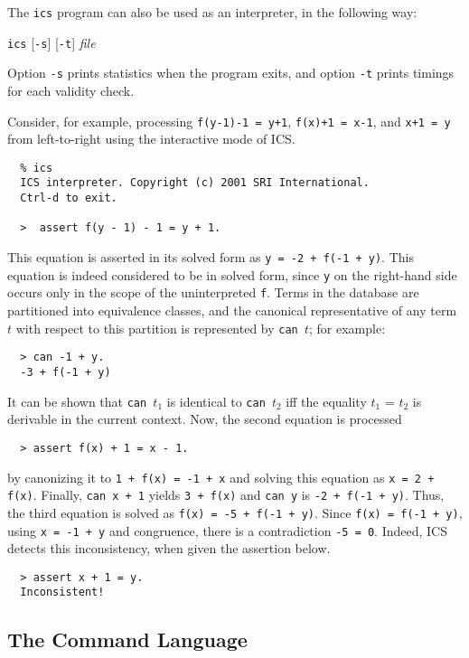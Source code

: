 \documentclass[12pt]{article}
\begin{document}
\bigskip
The \texttt{ics} program can also be used as an interpreter, in the
following way:
\begin{center}
  \texttt{ics} [\texttt{-s}] [\texttt{-t}] \textit{file}
\end{center}
Option \texttt{-s} prints statistics when the program exits, and
option \texttt{-t} prints timings for each validity check.

Consider, for example, processing
{\tt f(y-1)-1 = y+1}, {\tt f(x)+1 = x-1}, and {\tt x+1 = y}
from left-to-right using the interactive mode of ICS\@.
  \begin{verbatim}
  % ics
  ICS interpreter. Copyright (c) 2001 SRI International.
  Ctrl-d to exit.

  >  assert f(y - 1) - 1 = y + 1.
  \end{verbatim}
This equation is asserted in its solved form as
{\tt y = -2 + f(-1 + y)}\@. This equation is indeed considered
to be in solved form, since {\tt y} on the right-hand side occurs
only in the scope of the uninterpreted {\tt f}\@. Terms
in the database are partitioned
into equivalence classes, and the canonical representative of any
term $t$ with respect to this partition is represented by {\tt can $t$};
for example:
  \begin{verbatim}
  > can -1 + y.
  -3 + f(-1 + y)
  \end{verbatim}
It can be shown that {\tt can $t_1$} is identical to {\tt can $t_2$}
iff the equality $t_1$ = $t_2$ is derivable in the current context.
Now, the second equation is processed
  \begin{verbatim}
  > assert f(x) + 1 = x - 1.
  \end{verbatim}
\vspace{-5mm}
by canonizing it to {\tt 1 + f(x) = -1 + x} and solving this
equation as {\tt x = 2 + f(x)}. Finally, {\tt can x + 1} yields
{\tt 3 + f(x)} and {\tt can y} is {\tt -2 + f(-1 + y)}. Thus,
the third equation is solved as {\tt f(x) = -5 + f(-1 + y)}\@.
Since {\tt f(x) = f(-1 + y)}, using {\tt x = -1 + y} and congruence,
there is a contradiction {\tt -5 = 0}\@.
Indeed, ICS detects this inconsistency, when given the assertion
below.
 \begin{verbatim}
  > assert x + 1 = y.
  Inconsistent!
  \end{verbatim}
\vspace{-5mm}


\subsection{The Command Language}
\end{document}
